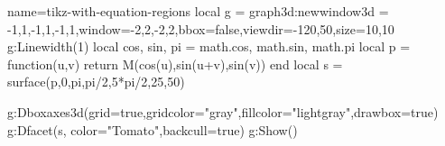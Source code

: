 \documentclass[border=5pt]{standalone}%
\begin{document}
\begin{luadraw}{name=tikz-with-equation-regions}
local g = graph3d:new{window3d = {-1,1,-1,1,-1,1},window={-2,2,-2,2},bbox=false,viewdir={-120,50},size={10,10}}
g:Linewidth(1)
local cos, sin, pi = math.cos, math.sin, math.pi
local  p = function(u,v) return M(cos(u),sin(u+v),sin(v)) end
local s = surface(p,0,pi,pi/2,5*pi/2,{25,50})

g:Dboxaxes3d({grid=true,gridcolor="gray",fillcolor="lightgray",drawbox=true})
g:Dfacet(s, {color="Tomato",backcull=true})
g:Show()
\end{luadraw}
\end{document}

